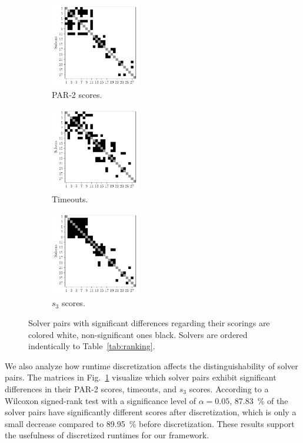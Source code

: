 \documentclass[sn-basic, Numbered]{sn-jnl} %
\begin{document}
\begin{figure}[tb]
	\centering
	\begin{subfigure}{0.32\textwidth}
		\centering
		\includegraphics[width=3.9cm]{../plots/par2sigdiff.pdf}
		\caption{PAR-2 scores.}
	\end{subfigure}
	\begin{subfigure}{0.32\textwidth}
		\centering
		\includegraphics[width=3.9cm]{../plots/timeoutsigdiff.pdf}
		\caption{Timeouts.}
	\end{subfigure}
	\begin{subfigure}{0.32\textwidth}
		\centering
		\includegraphics[width=3.9cm]{../plots/s3sigdiff.pdf}
		\caption{$s_3$ scores.}
	\end{subfigure}
	\caption{Solver pairs with significant differences regarding their scorings are colored white, non-significant ones black. Solvers are ordered indentically to Table~\ref{tab:ranking}.}
	\label{fig:solver-confusion-matrices}
\end{figure}

We also analyze how runtime discretization affects the distinguishability of solver pairs.
The matrices in Fig.~\ref{fig:solver-confusion-matrices} visualize which solver pairs exhibit significant differences in their PAR-2 scores, timeouts, and $s_3$ scores.
According to a Wilcoxon signed-rank test with a significance level of $\alpha = 0.05$, \SI{87.83}{\%} of the solver pairs have significantly different scores after discretization, which is only a small decrease compared to \SI{89.95}{\%} before discretization.
These results support the usefulness of discretized runtimes for our framework.
\end{document}
